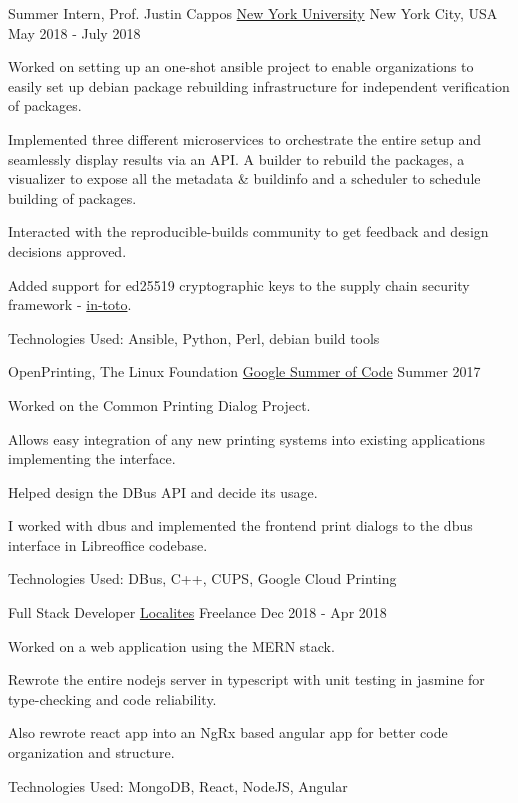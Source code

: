 \begin{cventries}
  \cventry
  {Summer Intern, Prof. Justin Cappos}
  {\href{https://yashsriv.org/2018/07/nyu.html}{New York University}}
  {New York City, USA}
  {May 2018 - July 2018}
  {
    \begin{cvitems}
      \item Worked on setting up an one-shot ansible project to enable
        organizations to easily set up debian package rebuilding infrastructure
        for independent verification of packages.
      \item Implemented three different microservices to orchestrate the entire
        setup and seamlessly display results via an API.
    \ifdefined\ONEPAGE
    \else
        A builder to rebuild the packages, a visualizer to expose all the
        metadata \& buildinfo and a scheduler to schedule building of packages.
        \fi
      \item Interacted with the reproducible-builds community to get feedback
        and design decisions approved.
      \item Added support for ed25519 cryptographic keys to the supply chain security
        framework - \href{https://in-toto.io/}{in-toto}.
        \ifdefined \ONEPAGE \else
      \item Technologies Used: Ansible, Python, Perl, debian build tools
        \fi
    \end{cvitems}
  }

  \cventry
  {OpenPrinting, The Linux Foundation}
  {\href{https://yashsriv.org/2017/08/gsoc.html}{Google Summer of Code}}
  {}
  {Summer 2017}
  {
    \begin{cvitems}
      \item Worked on the Common Printing Dialog Project.
      \item Allows easy integration of any new printing systems into existing
        applications implementing the interface.
      \item Helped design the DBus API and decide its usage.
      \item I worked with dbus and implemented the frontend print dialogs to the
        dbus interface in Libreoffice codebase.
        \ifdefined \ONEPAGE \else
      \item Technologies Used: DBus, C++, CUPS, Google Cloud Printing
        \fi
    \end{cvitems}
  }

  \cventry
  {Full Stack Developer}
  {\href{http://www.localites.com}{Localites}}
  {Freelance}
  {Dec 2018 - Apr 2018}
  {
    \begin{cvitems}
    \item Worked on a web application using the MERN stack.
    \item Rewrote the entire nodejs server in typescript with unit testing in
      jasmine for type-checking and code reliability.
    \item Also rewrote react app into an NgRx based angular app for better code
      organization and structure.
        \ifdefined \ONEPAGE \else
    \item Technologies Used: MongoDB, React, NodeJS, Angular
        \fi
    \end{cvitems}
  }

\end{cventries}
\vspace{-2mm}

